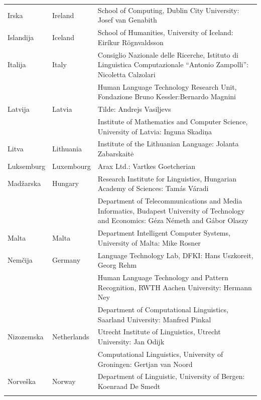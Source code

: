 \begin{longtable}{@{}llp{113mm}@{}}
  Irska & \textcolor{grey1}{Ireland} & School of Computing, Dublin City University: Josef van Genabith\\ \addlinespace
  Islandija & \textcolor{grey1}{Iceland} & School of Humanities, University of Iceland: Eiríkur Rögnvaldsson\\ \addlinespace
  Italija & \textcolor{grey1}{Italy} & Consiglio Nazionale delle Ricerche, Istituto di Linguistica Computazionale “Antonio Zampolli”: Nicoletta Calzolari\\ \addlinespace
  & & Human Language Technology Research Unit, Fondazione Bruno Kessler:\newline Bernardo Magnini\\ \addlinespace
  Latvija & \textcolor{grey1}{Latvia} & Tilde: Andrejs Vasiļjevs\\ \addlinespace 
  & & Institute of Mathematics and Computer Science, University of Latvia: Inguna Skadiņa\\ \addlinespace
  Litva & \textcolor{grey1}{Lithuania} & Institute of the Lithuanian Language: Jolanta Zabarskaitė\\ \addlinespace
  Luksemburg & \textcolor{grey1}{Luxembourg} & Arax Ltd.: Vartkes Goetcherian\\ \addlinespace
  Madžarska & \textcolor{grey1}{Hungary} & Research Institute for Linguistics, Hungarian Academy of Sciences: Tamás Váradi\\  \addlinespace
  & & Department of Telecommunications and Media Informatics, Budapest University of Technology and Economics: Géza Németh and Gábor Olaszy\\ \addlinespace
  Malta & \textcolor{grey1}{Malta} & Department Intelligent Computer Systems, University of Malta: Mike Rosner\\ \addlinespace
  Nemčija & \textcolor{grey1}{Germany} & Language Technology Lab, DFKI: Hans Uszkoreit, Georg Rehm\\ \addlinespace
  & & Human Language Technology and Pattern Recognition, RWTH Aachen University: Hermann Ney \\ \addlinespace
  & & Department of Computational Linguistics, Saarland University: Manfred Pinkal\\ \addlinespace 
  Nizozemska & \textcolor{grey1}{Netherlands} & Utrecht Institute of Linguistics, Utrecht University: Jan Odijk\\ \addlinespace 
  & & Computational Linguistics, University of Groningen: Gertjan van Noord\\ \addlinespace
  Norveška & \textcolor{grey1}{Norway} & Department of Linguistic, University of Bergen: Koenraad De Smedt\\ \addlinespace 

\end{longtable}
